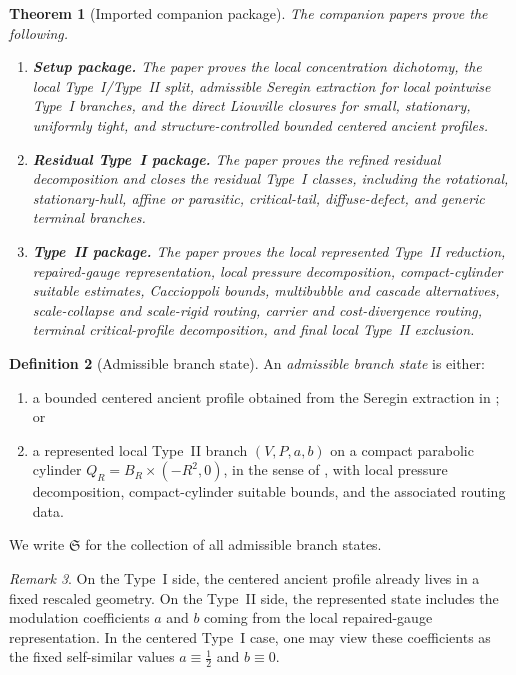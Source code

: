 \documentclass[11pt]{amsart}
\numberwithin{equation}{section}
\theoremstyle{plain}
\newtheorem{theorem}{Theorem}[section]
\theoremstyle{definition}
\newtheorem{definition}[theorem]{Definition}
\theoremstyle{remark}
\newtheorem{remark}[theorem]{Remark}
\newcommand{\State}{\mathfrak S}
\begin{document}
\begin{theorem}[Imported companion package]
\label{thm:companion-package}
The companion papers \cite{BallesterSetup,BallesterResidual,BallesterTypeII}
prove the following.
\begin{enumerate}[label=\textup{(\arabic*)},leftmargin=2.2em]
	\item \textbf{Setup package.}  The paper \cite{BallesterSetup} proves the
	local concentration dichotomy, the local Type~I/Type~II split, admissible
	Seregin extraction for local pointwise Type~I branches, and the direct
	Liouville closures for small, stationary, uniformly tight, and
	structure-controlled bounded centered ancient profiles.
	\item \textbf{Residual Type~I package.}  The paper
	\cite{BallesterResidual} proves the refined residual decomposition and closes
	the residual Type~I classes, including the rotational, stationary-hull,
	affine or parasitic, critical-tail, diffuse-defect, and generic terminal
	branches.
	\item \textbf{Type~II package.}  The paper \cite{BallesterTypeII} proves the
	local represented Type~II reduction, repaired-gauge representation, local
	pressure decomposition, compact-cylinder suitable estimates, Caccioppoli
	bounds, multibubble and cascade alternatives, scale-collapse and scale-rigid
	routing, carrier and cost-divergence routing, terminal critical-profile
	decomposition, and final local Type~II exclusion.
\end{enumerate}
\end{theorem}

\begin{definition}[Admissible branch state]
\label{def:admissible-state}
An \emph{admissible branch state} is either:
\begin{enumerate}[label=\textup{(\roman*)},leftmargin=2.2em]
	\item a bounded centered ancient profile obtained from the Seregin extraction
	in \cite{BallesterSetup}; or
	\item a represented local Type~II branch \((V,P,a,b)\) on a compact
	parabolic cylinder \(Q_R=B_R\times(-R^2,0)\), in the sense of
	\cite{BallesterTypeII}, with local pressure decomposition, compact-cylinder
	suitable bounds, and the associated routing data.
\end{enumerate}
We write \(\State\) for the collection of all admissible branch states.
\end{definition}

\begin{remark}
On the Type~I side, the centered ancient profile already lives in a fixed
rescaled geometry.  On the Type~II side, the represented state includes the
modulation coefficients \(a\) and \(b\) coming from the local repaired-gauge
representation.  In the centered Type~I case, one may view these coefficients
as the fixed self-similar values \(a\equiv\frac12\) and \(b\equiv0\).
\end{remark}
\end{document}
